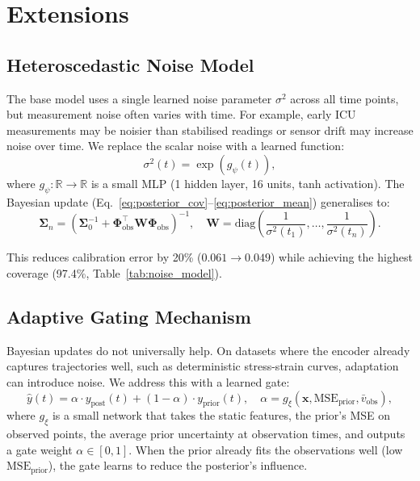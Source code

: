 \documentclass[final]{article}
\begin{document}
\section{Extensions}
\label{sec:extensions}

\subsection{Heteroscedastic Noise Model}
\label{sec:heteroscedastic}

The base model uses a single learned noise parameter $\sigma^2$ across all time points, but measurement noise often varies with time. For example, early ICU measurements may be noisier than stabilised readings or sensor drift may increase noise over time. We replace the scalar noise with a learned function:
\begin{equation}
    \sigma^2(t) = \exp\!\left(g_\psi(t)\right),
\end{equation}
where $g_\psi: \mathbb{R} \to \mathbb{R}$ is a small MLP (1 hidden layer, 16 units, tanh activation). The Bayesian update (Eq.~\ref{eq:posterior_cov}--\ref{eq:posterior_mean}) generalises to:
\begin{equation}
    \boldsymbol{\Sigma}_n = \left(\boldsymbol{\Sigma}_0^{-1} + \boldsymbol{\Phi}_{\mathrm{obs}}^\top \mathbf{W} \boldsymbol{\Phi}_{\mathrm{obs}}\right)^{-1}, \quad \mathbf{W} = \mathrm{diag}\!\left(\frac{1}{\sigma^2(t_1)}, \ldots, \frac{1}{\sigma^2(t_n)}\right).
\end{equation}

This reduces calibration error by 20\% ($0.061 \to 0.049$) while achieving the highest coverage (97.4\%, Table~\ref{tab:noise_model}).

\subsection{Adaptive Gating Mechanism}
\label{sec:gating}

Bayesian updates do not universally help. On datasets where the encoder already captures trajectories well, such as deterministic stress-strain curves, adaptation can introduce noise. We address this with a learned gate:
\begin{equation}
    \hat{y}(t) = \alpha \cdot y_{\mathrm{post}}(t) + (1 - \alpha) \cdot y_{\mathrm{prior}}(t), \quad \alpha = g_\xi(\mathbf{x}, \mathrm{MSE}_{\mathrm{prior}}, \bar{v}_{\mathrm{obs}}),
    \label{eq:gate}
\end{equation}
where $g_\xi$ is a small network that takes the static features, the prior's MSE on observed points, the average prior uncertainty at observation times, and outputs a gate weight $\alpha \in [0, 1]$. When the prior already fits the observations well (low $\mathrm{MSE}_{\mathrm{prior}}$), the gate learns to reduce the posterior's influence.
\end{document}

